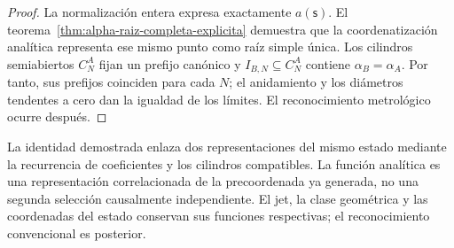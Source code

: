 \begin{proof}
La normalización entera expresa exactamente \(a(\mathsf s)\). El
teorema~\ref{thm:alpha-raiz-completa-explicita} demuestra que la coordenatización
analítica representa ese mismo punto como raíz simple única. Los
cilindros semiabiertos \(C_N^A\) fijan un prefijo canónico y
\(I_{B,N}\subseteq C_N^A\) contiene \(\alpha_B=\alpha_A\). Por tanto, sus
prefijos coinciden para cada \(N\); el anidamiento y los diámetros tendentes a
cero dan la igualdad de los límites. El reconocimiento
metrológico ocurre después.
\end{proof}

La identidad demostrada enlaza dos representaciones del mismo estado
mediante la recurrencia de coeficientes y los cilindros compatibles.
La función analítica es una representación correlacionada de la
precoordenada ya generada, no una segunda selección causalmente
independiente. El jet, la clase geométrica y las coordenadas del estado
conservan sus funciones respectivas; el reconocimiento convencional es posterior.
